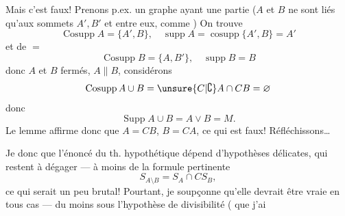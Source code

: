 
Mais c'est faux! Prenons p.ex. un graphe ayant une partie
($A$ et $B$ ne sont liés qu'aux sommets $A',B'$ et entre eux, comme ) On trouve
\[
\operatorname{Cosupp}A=\{A',B\},\quad\operatorname{supp}A=\operatorname{cosupp}\{A',B\}=A'
\]
et de $=$
\[
\operatorname{Cosupp}B=\{A,B'\},\quad\operatorname{supp}B=B
\]
donc $A$ et $B$ fermés, $A\parallel B$, considérons
\[
\operatorname{Cosupp}A\cup B=\unsure{C|\complement}A\cap CB=\varnothing
\]
donc
\[
\operatorname{Supp}A\cup B=A\vee B=M.
\]
Le lemme affirme donc que $A=CB$, $B=CA$, ce qui est faux! Réfléchissons\ldots

Je  donc que  l'énoncé du th. hypothétique dépend d'hypothèses délicates, qui restent à dégager --- à moins de   la formule pertinente
\[
S_{A\setminus B}=S_A\cap CS_B,
\]
ce qui serait un peu brutal! Pourtant, je soupçonne qu'elle devrait être vraie en tous cas --- du moins sous l'hypothèse de divisibilité  (  que j'ai
